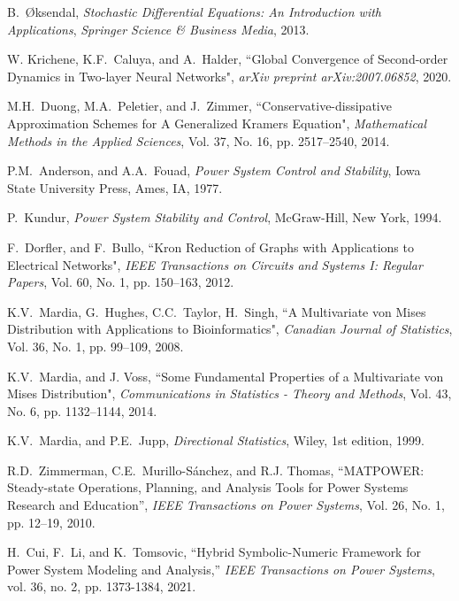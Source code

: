 \documentclass[10pt,twocolumn]{IEEEtran}
\begin{document}
\begin{thebibliography}{99}

B.~\O{}ksendal, \emph{Stochastic Differential Equations: An Introduction with Applications}, \emph{Springer Science \& Business Media}, 2013.


W. Krichene, K.F.~Caluya, and A.~Halder, ``Global Convergence of Second-order Dynamics in Two-layer Neural Networks", \emph{arXiv preprint arXiv:2007.06852}, 2020.


M.H.~Duong, M.A.~Peletier, and J.~Zimmer, ``Conservative-dissipative Approximation Schemes for A Generalized Kramers Equation", \emph{Mathematical Methods in the Applied Sciences}, Vol. 37, No. 16, pp. 2517--2540, 2014.


P.M.~Anderson, and A.A.~Fouad, \emph{Power System Control and Stability}, Iowa State University Press, Ames, IA, 1977.

P.~Kundur, \emph{Power System Stability and Control}, McGraw-Hill, New York, 1994.


F.~Dorfler, and F.~Bullo, ``Kron Reduction of Graphs with Applications to Electrical Networks", \emph{IEEE Transactions on Circuits and Systems I: Regular Papers}, Vol. 60, No. 1, pp. 150--163, 2012.

K.V.~Mardia, G.~Hughes, C.C.~Taylor, H.~Singh, ``A Multivariate von Mises Distribution with Applications to Bioinformatics", \emph{Canadian Journal of Statistics}, Vol. 36, No. 1, pp. 99--109, 2008.

K.V.~Mardia, and J. Voss, ``Some Fundamental Properties of a
Multivariate von Mises Distribution", \emph{Communications in Statistics - Theory and Methods}, Vol. 43, No. 6, pp. 1132--1144, 2014.

K.V.~Mardia, and P.E.~Jupp, \emph{Directional Statistics}, Wiley, 1st edition, 1999.

R.D.~Zimmerman, C.E.~Murillo-S{\'a}nchez, and R.J. Thomas, ``MATPOWER: Steady-state Operations, Planning, and Analysis Tools for Power Systems Research and Education'', \emph{IEEE Transactions on Power Systems},  Vol. 26, No. 1, pp. 12--19, 2010.

H.~Cui, F.~Li, and K.~Tomsovic, ``Hybrid Symbolic-Numeric Framework for Power System Modeling and Analysis,'' \emph{IEEE Transactions on Power Systems}, vol. 36, no. 2, pp. 1373-1384, 2021.
	
\end{thebibliography}
\end{document}
